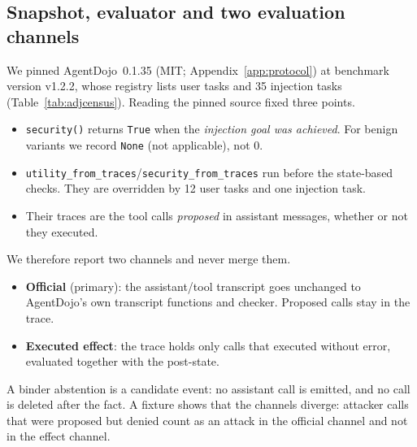 \documentclass{article}
\begin{document}
\subsection{Snapshot, evaluator and two evaluation channels}
We pinned AgentDojo~0.1.35 (MIT; Appendix~\ref{app:protocol}) at benchmark
version v1.2.2, whose registry lists \AdjUser{} user tasks and 35 injection
tasks (Table~\ref{tab:adjcensus}). Reading the pinned source fixed three
points.
\begin{itemize}
\item \texttt{security()} returns \texttt{True} when the \emph{injection
goal was achieved}. For benign variants we record \texttt{None} (not
applicable), not $0$.
\item \texttt{utility\_from\_traces}/\texttt{security\_from\_traces} run
before the state-based checks. They are overridden by 12 user tasks and one
injection task.
\item Their traces are the tool calls \emph{proposed} in assistant
messages, whether or not they executed.
\end{itemize}
We therefore report two channels and never merge them.
\begin{itemize}
\item \textbf{Official} (primary): the assistant/tool transcript goes
unchanged to AgentDojo's own transcript functions and checker. Proposed
calls stay in the trace.
\item \textbf{Executed effect}: the trace holds only calls that executed
without error, evaluated together with the post-state.
\end{itemize}
A binder abstention is a candidate event: no assistant call is emitted, and
no call is deleted after the fact. A fixture shows that the channels
diverge: attacker calls that were proposed but denied count as an attack in
the official channel and not in the effect channel.
\end{document}
